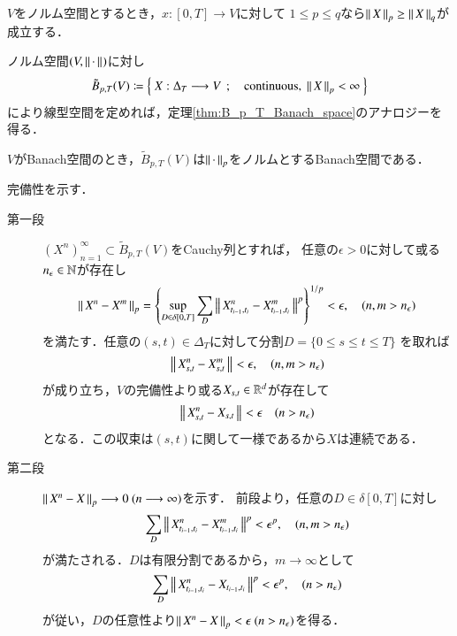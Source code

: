 	\begin{screen}
		\begin{thm}
			$V$をノルム空間とするとき，$x:[0,T] \longrightarrow V$に対して
			$1 \leq p \leq q$なら$\left\|\, X\, \right\|_{p} \geq \left\|\, X\, \right\|_{q}$が成立する．
		\end{thm}
	\end{screen}
	
	ノルム空間$(V,\left\|\, \cdot\, \right\|_{})$に対し
	\begin{align}
		\tilde{B}_{p,T}(V)
		\coloneqq \Set{X:\Delta_T \longrightarrow V}{\mbox{continuous},\ \Norm{X}{p} < \infty}
	\end{align}
	により線型空間を定めれば，定理\ref{thm:B_p_T_Banach_space}のアナロジーを得る．
	
	\begin{screen}
		\begin{thm}\label{thm:B_p_T_Banach_space_2}
			$V$がBanach空間のとき，$\tilde{B}_{p,T}(V)$は$\left\|\, \cdot\, \right\|_{p}$をノルムとするBanach空間である．
		\end{thm}
	\end{screen}

\begin{prf}完備性を示す．
	\begin{description}
		\item[第一段] $(X^n)_{n=1}^{\infty} \subset \tilde{B}_{p,T}(V)$をCauchy列とすれば，
			任意の$\epsilon > 0$に対して或る$n_\epsilon \in \mathbb{N}$が存在し
			\begin{align}
				\left\|\, X^n - X^m\, \right\|_{p}
				= \left\{ \operatorname*{sup}_{D \in \delta[0,T]} \sum_{D} 
				\left\|\, X^n_{t_{i-1},t_i} - X^m_{t_{i-1},t_i}\, \right\|_{}^p \right\}^{1/p} < \epsilon,
				\quad (n,m > n_\epsilon)
			\end{align}
			を満たす．任意の$(s,t) \in \Delta_T$に対して分割$D = \{0 \leq s \leq t \leq T\}$
			を取れば
			\begin{align}
				\left\|\, X^n_{s,t} - X^m_{s,t}\, \right\|_{} < \epsilon,
				\quad (n,m > n_\epsilon)
			\end{align}
			が成り立ち，$V$の完備性より或る$X_{s,t} \in \mathbb{R}^d$が存在して
			\begin{align}
				\left\|\, X^n_{s,t} - X_{s,t}\, \right\|_{} < \epsilon
				\quad (n > n_\epsilon)
			\end{align}
			となる．この収束は$(s,t)$に関して一様であるから$X$は連続である．
			
		\item[第二段] $\left\|\, X^n - X\, \right\|_{p} \longrightarrow 0\ (n \longrightarrow \infty)$を示す．
			前段より，任意の$D \in \delta[0,T]$に対し
			\begin{align}
				\sum_D \left\|\, X^n_{t_{i-1},t_i} - X^m_{t_{i-1},t_i}\, \right\|_{}^p
				< \epsilon^p,
				\quad (n,m > n_\epsilon)
			\end{align}
			が満たされる．$D$は有限分割であるから，$m \longrightarrow \infty$として
			\begin{align}
				\sum_D \left\|\, X^n_{t_{i-1},t_i} - X_{t_{i-1},t_i}\, \right\|_{}^p
				< \epsilon^p,
				\quad (n > n_\epsilon)
			\end{align}
			が従い，$D$の任意性より$\left\|\, X^n - X\, \right\|_{p} < \epsilon\ (n > n_\epsilon)$を得る．
			\QED
	\end{description}
\end{prf}

